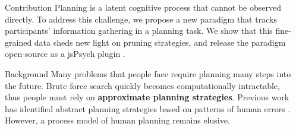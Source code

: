 \documentclass[final]{beamer}
\newlength{\sepwid}
\newlength{\onecolwid}
\begin{document}
\begin{frame}[t, fragile] %
\begin{columns}[t] %
\begin{column}{\sepwid}\end{column} %


\begin{column}{\onecolwid} %
  \begin{block}{Contribution}\label{contribution}
    Planning is a latent cognitive process that cannot be observed directly.
    To address this challenge, we propose a new paradigm that tracks participants' information gathering in a planning task.
    We show that this fine-grained data sheds new light on pruning strategies, and release the paradigm open-source as a jsPsych plugin \cite{DeLeeuw2015}.
  \end{block}


  \begin{block}{Background}\label{Background}
    Many problems that people face require planning many steps into the future.
    Brute force search quickly becomes computationally intractable, thus people must rely on \textbf{approximate planning strategies}.
    Previous work has identified abstract planning strategies based on patterns of human errors \cite{Huys2015}.
    However, a process model of human planning remains elusive.


\end{block}
\end{column}
\end{columns}
\end{frame}
\end{document}
